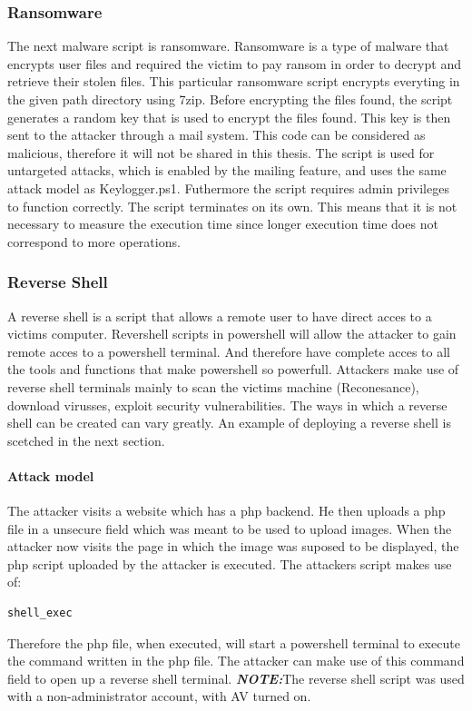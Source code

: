 \documentclass{article}%
\begin{document}
\subsubsection{Ransomware}
The next malware script is ransomware. Ransomware is a type of malware that encrypts user files and required the victim to pay ransom in order to decrypt and retrieve their stolen files. This particular ransomware script encrypts everyting in the given path directory using 7zip. Before encrypting the files found, the script generates a random key that is used to encrypt the files found. This key is then sent to the attacker through a mail system. This code can be considered as malicious, therefore it will not be shared in this thesis. The script is used for untargeted attacks, which is enabled by the mailing feature, and uses the same attack model as Keylogger.ps1. Futhermore the script requires admin privileges to function correctly. The script terminates on its own. This means that it is not necessary to measure the execution time since longer execution time does not correspond to more operations.

\subsubsection{Reverse Shell}
A reverse shell is a script that allows a remote user to have direct acces to a victims computer. Revershell scripts in powershell will allow the attacker to gain remote acces to a powershell terminal. And therefore have complete acces to all the tools and functions that make powershell so powerfull. Attackers make use of reverse shell terminals mainly to scan the victims machine (Reconesance), download virusses, exploit security vulnerabilities. The ways in which a reverse shell can be created can vary greatly. An example of deploying a reverse shell is scetched in the next section.
\paragraph{Attack model}\hfill
\newline
The attacker visits a website which has a php backend. He then uploads a php file in a unsecure field which was meant to be used to upload images. When the attacker now visits the page in which the image was suposed to be displayed, the php script uploaded by the attacker is executed. The attackers script makes use of:
\begin{verbatim}shell_exec\end{verbatim}
Therefore the php file, when executed, will start a powershell terminal to execute the command written in the php file. The attacker can make use of this command field to open up a reverse shell terminal. 
\newline\newline
\textit{\textbf{NOTE:}}The reverse shell script was used with a non-administrator account, with AV turned on.
\newline
\end{document}
